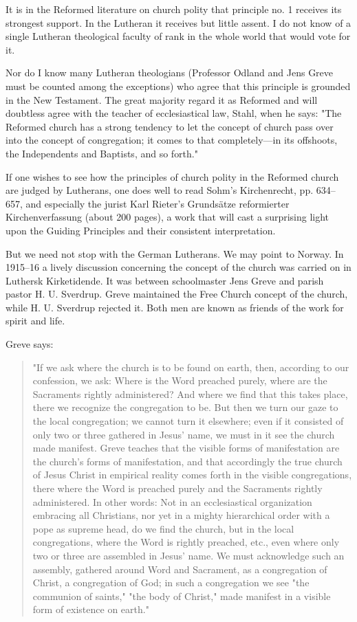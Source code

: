 It is in the Reformed literature on church polity that principle no. 1 receives its strongest support. In the Lutheran it receives but little assent. I do not know of a single Lutheran theological faculty of rank in the whole world that would vote for it.

Nor do I know many Lutheran theologians (Professor Odland and Jens Greve must be counted among the exceptions) who agree that this principle is grounded in the New Testament. The great majority regard it as Reformed and will doubtless agree with the teacher of ecclesiastical law, Stahl, when he says: "The Reformed church has a strong tendency to let the concept of church pass over into the concept of congregation; it comes to that completely—in its offshoots, the Independents and Baptists, and so forth."

If one wishes to see how the principles of church polity in the Reformed church are judged by Lutherans, one does well to read Sohm’s Kirchenrecht, pp. 634–657, and especially the jurist Karl Rieter’s Grundsätze reformierter Kirchenverfassung (about 200 pages), a work that will cast a surprising light upon the Guiding Principles and their consistent interpretation.

But we need not stop with the German Lutherans. We may point to Norway. In 1915–16 a lively discussion concerning the concept of the church was carried on in Luthersk Kirketidende. It was between schoolmaster Jens Greve and parish pastor H. U. Sverdrup. Greve maintained the Free Church concept of the church, while H. U. Sverdrup rejected it. Both men are known as friends of the work for spirit and life.

Greve says:
\begin{quote}
"If we ask where the church is to be found on earth, then, according to our confession, we ask: Where is the Word preached purely, where are the Sacraments rightly administered? And where we find that this takes place, there we recognize the congregation to be. But then we turn our gaze to the local congregation; we cannot turn it elsewhere; even if it consisted of only two or three gathered in Jesus’ name, we must in it see the church made manifest. Greve teaches that the visible forms of manifestation are the church’s forms of manifestation, and that accordingly the true church of Jesus Christ in empirical reality comes forth in the visible congregations, there where the Word is preached purely and the Sacraments rightly administered. In other words: Not in an ecclesiastical organization embracing all Christians, nor yet in a mighty hierarchical order with a pope as supreme head, do we find the church, but in the local congregations, where the Word is rightly preached, etc., even where only two or three are assembled in Jesus’ name. We must acknowledge such an assembly, gathered around Word and Sacrament, as a congregation of Christ, a congregation of God; in such a congregation we see "the communion of saints," "the body of Christ," made manifest in a visible form of existence on earth."
\end{quote}

